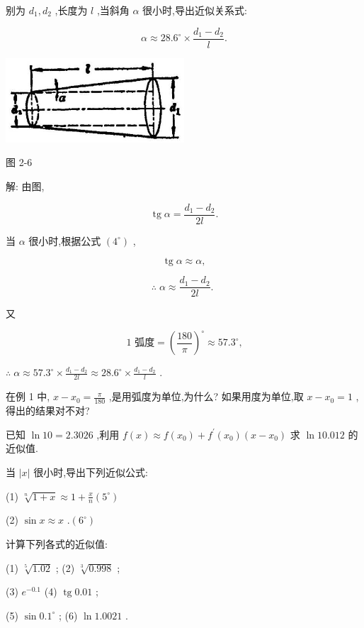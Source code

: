 \documentclass[lang=cn,newtx,10pt,scheme=chinese]{elegantbook}
\begin{document}
别为 \({d}_{1},{d}_{2}\) ,长度为 \(l\) ,当斜角 \(\alpha\) 很小时,导出近似关系式:

\[
\alpha \approx {28.6}^{ \circ } \times \frac{{d}_{1} - {d}_{2}}{l}.
\]

\begin{center}
\includegraphics[max width=0.5\textwidth]{images/01912c18-5c3f-733d-b775-749ba9897a9d_120_883650.jpg}
\end{center}

图 2-6

解: 由图,

\[
\operatorname{tg}\alpha = \frac{{d}_{1} - {d}_{2}}{2l}.
\]

当 \(\alpha\) 很小时,根据公式 \(\left( {4}^{ \circ }\right)\) ,

\[
\operatorname{tg}\alpha \approx \alpha ,
\]

\[
\therefore \;\alpha \approx \frac{{d}_{1} - {d}_{2}}{2l}\text{. }
\]

又

\[
\text{1 弧度} = {\left( \frac{180}{\pi }\right) }^{ \circ } \approx {57.3}^{ \circ }\text{,}
\]

\(\therefore \;\alpha \approx {57.3}^{ \circ } \times \frac{{d}_{1} - {d}_{2}}{2l} \approx {28.6}^{ \circ } \times \frac{{d}_{1} - {d}_{2}}{l}\) .

\begin{problemset}[练习]

\item 在例 1 中, \(x - {x}_{0} = \frac{\pi }{180}\) ,是用弧度为单位,为什么? 如果用度为单位,取 \(x - {x}_{0} = 1\) ,得出的结果对不对?

\item 已知 \(\ln {10} = {2.3026}\) ,利用 \(f\left( x\right) \approx f\left( {x}_{0}\right) + {f}^{\prime }\left( {x}_{0}\right) \left( {x - {x}_{0}}\right)\) 求 \(\ln {10.012}\) 的近似值.

\item 当 \(\left| x\right|\) 很小时,导出下列近似公式:

(1) \(\sqrt[n]{1 + x} \approx 1 + \frac{x}{n}\)\(\left( {5}^{ \circ }\right)\)

(2) \(\sin x \approx x\) .\(\left( {6}^{ \circ }\right)\)

\item 计算下列各式的近似值:

(1) \(\sqrt[5]{1.02}\) ; (2) \(\sqrt[3]{0.998}\) ;

(3) \({e}^{-{0.1}}\) (4) \(\operatorname{tg}{0.01}\) ;

(5) \(\sin {0.1}^{ \circ }\) ; (6) \(\ln {1.0021}\) .

\end{problemset}
\end{document}
